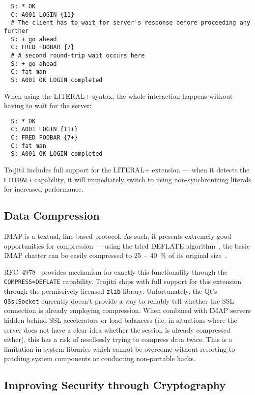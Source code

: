 \documentclass[trojita]{subfiles}
\begin{document}
\begin{verbatim}
  S: * OK
  C: A001 LOGIN {11}
  # The client has to wait for server's response before proceeding any further
  S: + go ahead
  C: FRED FOOBAR {7}
  # A second round-trip wait occurs here
  S: + go ahead
  C: fat man
  S: A001 OK LOGIN completed
\end{verbatim}

When using the LITERAL+ syntax, the whole interaction happens without having to wait for the server:

\begin{verbatim}
  S: * OK
  C: A001 LOGIN {11+}
  C: FRED FOOBAR {7+}
  C: fat man
  S: A001 OK LOGIN completed
\end{verbatim}

Trojitá includes full support for the LITERAL+ extension --- when it detects the {\tt LITERAL+} capability, it will
immediately switch to using non-synchronizing literals for increased performance.

\subsection{Data Compression}

IMAP is a textual, line-based protocol.  As such, it presents extremely good opportunities for compression --- using the
tried DEFLATE algorithm~\cite{rfc1951}, the basic IMAP chatter can be easily compressed to 25~-~40~\% of its original
size~\cite[p. 4]{rfc4978}.

RFC~4978~\cite{rfc4978} provides mechanism for exactly this functionality through the {\tt COMPRESS=DEFLATE} capability.
Trojitá ships with full support for this extension through the permissively licensed {\tt zlib} library.  Unfortunately,
the Qt's {\tt QSslSocket} currently doesn't provide a way to reliably tell whether the SSL connection is already
employing compression.  When combined with IMAP servers hidden behind SSL accelerators or load balancers (i.e. in
situations where the server does not have a clear idea whether the session is already compressed either), this has a
risk of needlessly trying to compress data twice.  This is a limitation in system libraries which cannot be overcome
without resorting to patching system components or conducting non-portable hacks.

\subsection{Improving Security through Cryptography}
\end{document}
